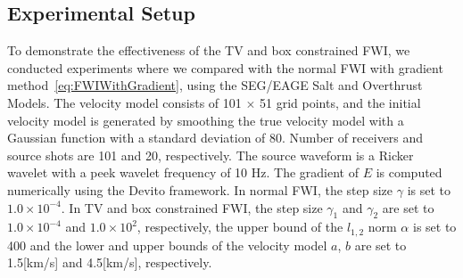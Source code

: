 \subsection{Experimental Setup}\label{subsec:experimental-setup}
%
%
%
To demonstrate the effectiveness of the TV and box constrained FWI, we conducted experiments where we compared with the normal FWI with gradient method~\eqref{eq:FWIWithGradient}, using the SEG/EAGE Salt and Overthrust Models.
The velocity model consists of 101 $\times$ 51 grid points, and the initial velocity model is generated by smoothing the true velocity model with a Gaussian function with a standard deviation of 80.
Number of receivers and source shots are 101 and 20, respectively.
The source waveform is a Ricker wavelet with a peek wavelet frequency of 10 Hz.
The gradient of $E$ is computed numerically using the Devito framework\cite{devito}.
In normal FWI, the step size $\gamma$ is set to $1.0 \times 10^{-4}$.
In TV and box constrained FWI, the step size $\gamma_1$ and $\gamma_2$ are set to $1.0 \times 10^{-4}$ and $1.0 \times 10^2$, respectively, the upper bound of the $l_{1,2}$ norm $\alpha$ is set to 400 and the lower and upper bounds of the velocity model $a$, $b$ are set to 1.5[km/s] and 4.5[km/s], respectively.




